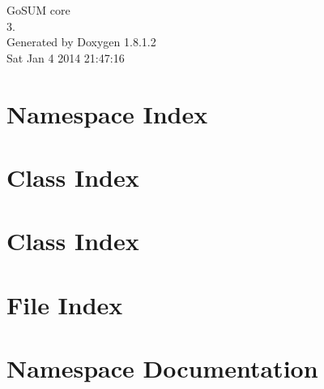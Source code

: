 \documentclass{book}
\begin{document}
\hypersetup{pageanchor=false,citecolor=blue}
\begin{titlepage}
\vspace*{7cm}
\begin{center}
{\Large Go\-S\-U\-M core \\[1ex]\large 3. }\\
\vspace*{1cm}
{\large Generated by Doxygen 1.8.1.2}\\
\vspace*{0.5cm}
{\small Sat Jan 4 2014 21:47:16}\\
\end{center}
\end{titlepage}
\clearemptydoublepage
{}
\tableofcontents
\clearemptydoublepage
{}
\hypersetup{pageanchor=true,citecolor=blue}
\chapter{Namespace Index}

\chapter{Class Index}

\chapter{Class Index}

\chapter{File Index}

\chapter{Namespace Documentation}



\end{document}

